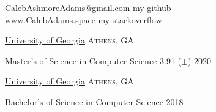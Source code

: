 \documentclass[10pt,a4paper]{article}
\begin{document}
\sloppy  %



\nobreakvspace{0.6em}  %

\noindent
\href{mailto:CalebAshmoreAdams@gmail.com}{CalebAshmoreAdams\mbox{}@\mbox{}gmail.com}
\hspace*{0pt}\hfill \href{https://github.com/piepieninja}{my github {\color{bluegreen} \faGithub}}
\\
\href{http://calebadams.space}{www.CalebAdams.space}
\hspace*{0pt}\hfill \href{https://stackoverflow.com/users/3704230/caleb-adams}{my stackoverflow {\color{bluegreen} \faStackOverflow}}
\\

\spacedhrule{0.2em}{-0.2em}
\spacedhrule{0.2em}{-0.2em}


\headedsection
  {\href{http://uga.edu}{University of Georgia}}
  {\textsc{Athens, GA}} {%
  \headedsubsection
    {Master's of Science in Computer Science}
    {3.91 ($\pm$) \hspace{2mm} 2020}
    {\bodytext{}}

  }
\headedsection
  {\href{http://uga.edu}{University of Georgia}}
  {\textsc{Athens, GA}} {%
  \headedsubsection
    {Bachelor's of Science in Computer Science}
    {2018}
    {\bodytext{}}

  }



\spacedhrule{0em}{-0.4em}
\end{document}
